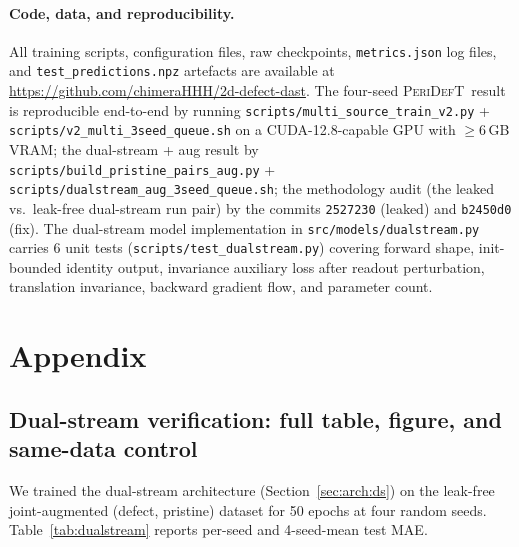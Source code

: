 \documentclass[11pt,a4paper]{article}
\newcommand{\modelname}{\textsc{PeriDefT}}
\begin{document}
\paragraph{Code, data, and reproducibility.}
All training scripts, configuration files, raw checkpoints,
\texttt{metrics.json} log files, and \texttt{test\_predictions.npz}
artefacts are available at
\url{https://github.com/chimeraHHH/2d-defect-dast}. The four-seed
\modelname\ result is reproducible end-to-end by running
\texttt{scripts/multi\_source\_train\_v2.py} +
\texttt{scripts/v2\_multi\_3seed\_queue.sh} on a CUDA-12.8-capable
GPU with $\ge 6$\,GB VRAM; the dual-stream + aug result by
\texttt{scripts/build\_pristine\_pairs\_aug.py} +
\texttt{scripts/dualstream\_aug\_3seed\_queue.sh}; the methodology
audit (the leaked vs.\ leak-free dual-stream run pair) by the
commits \texttt{2527230} (leaked) and \texttt{b2450d0} (fix). The
dual-stream model implementation in
\texttt{src/models/dualstream.py} carries 6 unit tests
(\texttt{scripts/test\_dualstream.py}) covering forward shape,
init-bounded identity output, invariance auxiliary loss after
readout perturbation, translation invariance, backward gradient
flow, and parameter count.




\appendix
\section{Appendix}\label{app:appendix}

\subsection{Dual-stream verification: full table, figure, and same-data control}\label{app:dualstream}

We trained the dual-stream architecture
(Section~\ref{sec:arch:ds}) on the leak-free joint-augmented
(defect, pristine) dataset for 50 epochs at four random seeds.
Table~\ref{tab:dualstream} reports per-seed and 4-seed-mean
test MAE.
\end{document}
